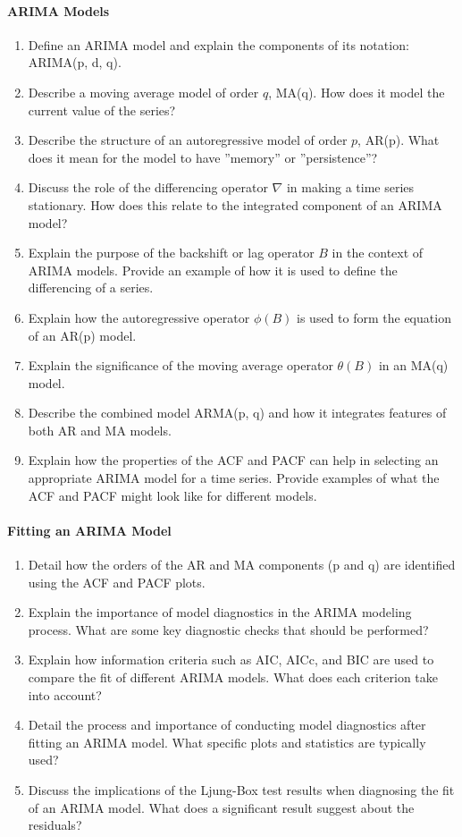 \paragraph*{ARIMA Models}
\begin{enumerate}
    \item Define an ARIMA model and explain the components of its notation: ARIMA(p, d, q).
    \item Describe a moving average model of order $q$, MA(q). How does it model the current value of the series?
    \item Describe the structure of an autoregressive model of order $p$, AR(p). What does it mean for the model to have ''memory'' or ''persistence''?
    \item Discuss the role of the differencing operator $\nabla$ in making a time series stationary. How does this relate to the integrated component of an ARIMA model?
    \item Explain the purpose of the backshift or lag operator $B$ in the context of ARIMA models. Provide an example of how it is used to define the differencing of a series.
    \item Explain how the autoregressive operator $\phi(B)$ is used to form the equation of an AR(p) model.
    \item Explain the significance of the moving average operator $\theta(B)$ in an MA(q) model.
    \item Describe the combined model ARMA(p, q) and how it integrates features of both AR and MA models.
    \item Explain how the properties of the ACF and PACF can help in selecting an appropriate ARIMA model for a time series. Provide examples of what the ACF and PACF might look like for different models.
\end{enumerate}
\paragraph*{Fitting an ARIMA Model}
\begin{enumerate}
    \item Detail how the orders of the AR and MA components (p and q) are identified using the ACF and PACF plots.
    \item Explain the importance of model diagnostics in the ARIMA modeling process. What are some key diagnostic checks that should be performed?
    \item Explain how information criteria such as AIC, AICc, and BIC are used to compare the fit of different ARIMA models. What does each criterion take into account?
    \item Detail the process and importance of conducting model diagnostics after fitting an ARIMA model. What specific plots and statistics are typically used?
    \item Discuss the implications of the Ljung-Box test results when diagnosing the fit of an ARIMA model. What does a significant result suggest about the residuals?
\end{enumerate}
